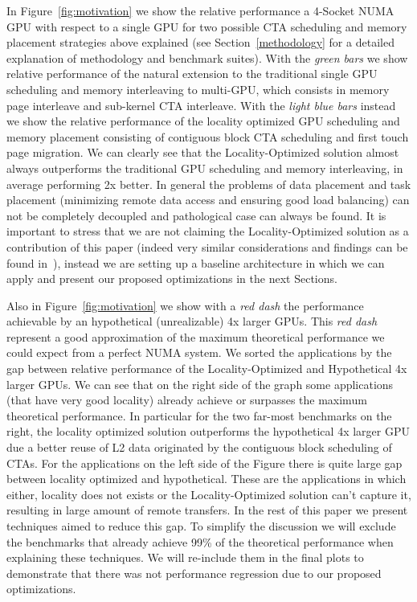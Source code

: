 In Figure~\ref{fig:motivation} we show the relative performance a 4-Socket 
NUMA GPU with respect to a single GPU for two possible CTA scheduling and 
memory placement strategies above explained (see Section~\ref{methodology} 
for a detailed explanation of methodology and benchmark suites). With the 
\emph{green bars} we show relative performance of the natural extension to 
the traditional single GPU scheduling and memory interleaving to 
multi-GPU, which consists in memory page interleave and sub-kernel CTA 
interleave. With the \emph{light blue bars} instead we show the relative 
performance of the locality optimized GPU scheduling and memory placement 
consisting of contiguous block CTA scheduling and first touch page 
migration. We can clearly see that the Locality-Optimized solution almost always 
outperforms the traditional GPU scheduling and memory interleaving, in 
average performing 2x better. In general the problems of data placement and 
task placement (minimizing remote data access and ensuring good load balancing) 
can not be completely decoupled and pathological case can always be found. It 
is important to stress that we are not claiming the Locality-Optimized solution 
as a contribution of this paper (indeed very similar considerations and findings 
can be found in~\cite{Cabezas2015,Arunkumar2017}), instead we are setting up a 
baseline architecture in which we can apply and present our proposed 
optimizations in the next Sections.

Also in Figure~\ref{fig:motivation} we show with a \emph{red dash} the performance 
achievable by an hypothetical (unrealizable) 4x larger GPUs. This \emph{red dash} 
represent a good approximation of the maximum theoretical performance we 
could expect from a perfect NUMA system. We sorted the applications by the 
gap between relative performance of the Locality-Optimized and 
Hypothetical 4x larger GPUs. We can see that on the right side of the graph 
some applications (that have very good locality) already 
achieve or surpasses the maximum theoretical performance. In particular for the 
two far-most benchmarks on the right, the locality optimized solution outperforms 
the hypothetical 4x larger GPU due a better reuse of L2 data originated by 
the contiguous block scheduling of CTAs. For the applications on the left 
side of the Figure there is quite large gap between locality optimized and 
hypothetical. These are the applications in which either, locality does not 
exists or the Locality-Optimized solution can't capture it, 
resulting in large amount of remote transfers. In the rest of this paper we 
present techniques aimed to reduce this gap. To simplify the discussion we 
will exclude the benchmarks that already achieve 99\% of the theoretical 
performance when explaining these techniques. We will re-include them in the 
final plots to demonstrate that there was not performance regression due to 
our proposed optimizations.
